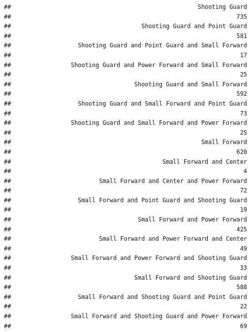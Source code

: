 \documentclass[
]{book}
\begin{document}
\begin{verbatim}
##                                                     Shooting Guard 
##                                                                735 
##                                     Shooting Guard and Point Guard 
##                                                                581 
##                   Shooting Guard and Point Guard and Small Forward 
##                                                                 17 
##                 Shooting Guard and Power Forward and Small Forward 
##                                                                 25 
##                                   Shooting Guard and Small Forward 
##                                                                592 
##                   Shooting Guard and Small Forward and Point Guard 
##                                                                 73 
##                 Shooting Guard and Small Forward and Power Forward 
##                                                                 25 
##                                                      Small Forward 
##                                                                620 
##                                           Small Forward and Center 
##                                                                  4 
##                         Small Forward and Center and Power Forward 
##                                                                 72 
##                   Small Forward and Point Guard and Shooting Guard 
##                                                                 19 
##                                    Small Forward and Power Forward 
##                                                                425 
##                         Small Forward and Power Forward and Center 
##                                                                 49 
##                 Small Forward and Power Forward and Shooting Guard 
##                                                                 33 
##                                   Small Forward and Shooting Guard 
##                                                                588 
##                   Small Forward and Shooting Guard and Point Guard 
##                                                                 22 
##                 Small Forward and Shooting Guard and Power Forward 
##                                                                 69
\end{verbatim}
\end{document}
